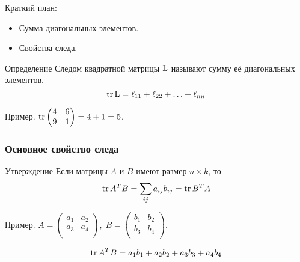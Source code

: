 
\begin{frame} %


\end{frame}



\begin{frame}{Краткий план:}
  \begin{itemize}[<+->] 
    \item Сумма диагональных элементов.
    \item Свойства следа.
  \end{itemize}

\end{frame}


\begin{frame}
    \begin{block}{Определение}
        \alert{Следом квадратной матрицы} $\operatorname{L}$ называют сумму её диагональных элементов. 
        \[
            \trace \LL = \ell_{11} + \ell_{22} + \ldots + \ell_{nn}
        \]
    \end{block}

    \pause
    Пример. $\trace \begin{pmatrix}
        4 & 6 \\
        9 & 1
    \end{pmatrix} = 4 + 1 = 5$.

\end{frame}





\begin{frame}
    \frametitle{Основное свойство следа}

    \begin{block}{Утверждение}
        Если матрицы $A$ и $B$ имеют размер $n\times k$, то
        \[
        \trace A^T B = \sum_{ij} a_{ij} b_{ij} = \trace B^T A
        \]

    \end{block}
    \pause

    Пример. $A = \begin{pmatrix}
        a_1 & a_2 \\
        a_3 & a_4 \\ 
    \end{pmatrix},  \;
    B = \begin{pmatrix}
        b_1 & b_2 \\
        b_3 & b_4 \\ 
    \end{pmatrix}$.

    \[
    \trace A^T B = a_1 b_1 + a_2 b_2 + a_3 b_3 + a_4 b_4    
    \]

\end{frame}


